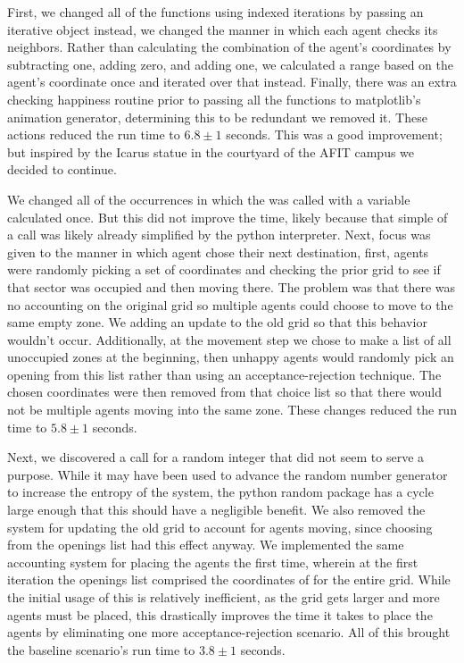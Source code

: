 \documentclass[sigplan,nonacm]{acmart}
\begin{document}
First, we changed all of the functions using indexed iterations by passing an iterative object instead,
we changed the manner in which each agent checks its neighbors.
Rather than calculating the combination of the agent's coordinates by subtracting one, adding zero, and adding one,
we calculated a range based on the agent's coordinate once and iterated over that instead.
Finally, there was an extra checking happiness routine prior to passing all the functions to matplotlib's
animation generator, determining this to be redundant we removed it.
These actions reduced the run time to \(6.8\pm1\) seconds.
This was a good improvement; but inspired by the Icarus statue in the courtyard of the AFIT campus we decided to continue.


We changed all of the occurrences in which the  was called with a variable calculated once.
But this did not improve the time, likely because that simple of a call was likely already simplified by the python interpreter.
Next, focus was given to the manner in which agent chose their next destination, first, agents were randomly picking 
a set of coordinates and checking the prior grid to see if that sector was occupied and then moving there.
The problem was that there was no accounting on the original grid so multiple agents could choose to move to the same empty zone.
We adding an update to the old grid so that this behavior wouldn't occur. Additionally, at the movement
step we chose to make a list of all unoccupied zones at the beginning, then unhappy agents would randomly pick an opening from
this list rather than using an acceptance-rejection technique.
The chosen coordinates were then removed from that choice list so that there would not be multiple agents moving into the same zone.
These changes reduced the run time to \(5.8\pm1\) seconds.

Next, we discovered a call for a random integer that did not seem to serve a purpose.
While it may have been used to advance the random number generator to increase the entropy of the system,
the python random package has a cycle large enough that this should have a negligible benefit.
We also removed the system for updating the old grid to account for agents moving,
since choosing from the openings list had this effect anyway.
We implemented the same accounting system for placing the agents the first time,
wherein at the first iteration the openings list comprised the coordinates of for the entire grid.
While the initial usage of this is relatively inefficient, as the grid gets larger and more agents must be placed,
this drastically improves the time it takes to place the agents by eliminating one more acceptance-rejection scenario.
All of this brought the baseline scenario's run time to \(3.8\pm1\) seconds.
\end{document}
